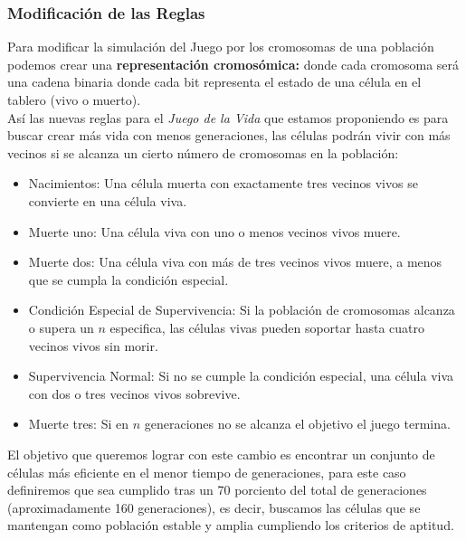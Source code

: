 \subsubsection*{Modificación de las Reglas}

Para modificar la simulación del Juego por los cromosomas de una población podemos crear
una \textbf{representación cromosómica:} donde cada cromosoma será una cadena binaria 
donde cada bit representa el estado de una célula en el tablero (vivo o muerto).\\ 

Así las nuevas reglas para el \textit{Juego de la Vida} que estamos proponiendo es para 
buscar crear más vida con menos generaciones, las células  podrán vivir con más vecinos 
si se alcanza un cierto número de cromosomas en la población:

\begin{itemize}
    \item Nacimientos: Una célula muerta con exactamente tres vecinos vivos se convierte 
    en una célula viva.
    \item Muerte uno: Una célula viva con uno o menos vecinos vivos muere.
    \item Muerte dos: Una célula viva con más de tres vecinos vivos muere, a menos que se 
    cumpla la condición especial.
    \item Condición Especial de Supervivencia: Si la población de cromosomas alcanza o 
    supera un $n$ especifica, las células vivas pueden soportar hasta cuatro 
    vecinos vivos sin morir.
    \item Supervivencia Normal: Si no se cumple la condición especial, una célula viva con 
    dos o tres vecinos vivos sobrevive.
    \item Muerte tres: Si en $n$ generaciones no se alcanza el objetivo el juego termina.
\end{itemize}

El objetivo que queremos lograr con este cambio es encontrar un conjunto de células más eficiente
en el menor tiempo de generaciones, para este caso definiremos que sea cumplido tras un 
70 porciento del total de generaciones (aproximadamente 160 generaciones), es decir, buscamos 
las células que se mantengan como población estable y amplia cumpliendo los criterios de aptitud.

